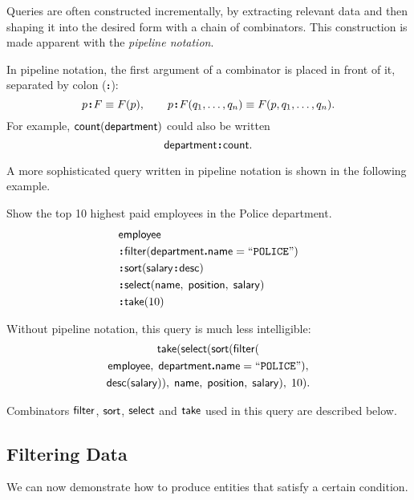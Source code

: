 Queries are often constructed incrementally, by extracting relevant data and
then shaping it into the desired form with a chain of combinators.  This
construction is made apparent with the \emph{pipeline notation}.

In pipeline notation, the first argument of a combinator is placed in front of
it, separated by colon ($\,\!\boldsymbol{:}\!\,$):
\begin{equation*}
    p \!\boldsymbol{:}\! F \equiv F(p), \qquad
    p \!\boldsymbol{:}\! F(q_1,\ldots,q_n) \equiv F(p,q_1,\ldots,q_n).
\end{equation*}
For example, $\mathsf{count}(\mathsf{department})$ could also be written
\begin{equation*}
    \mathsf{department}\!\boldsymbol{:}\!\mathsf{count}.
\end{equation*}

A more sophisticated query written in pipeline notation is shown in the
following example.

\begin{demo}
    \label{ex:top-ten-highest-paid-policemen}
    Show the top 10 highest paid employees in the Police department.
    \begin{align*}
        & \Employee \\
        & \Apply\Filter(\Department\To\Name = \textliteral{POLICE}) \\
        & \Apply\Sort(\Salary\Apply\Desc) \\
        & \Apply\Select(\Name,\; \Position,\; \Salary) \\
        & \Apply\Take(10)
    \end{align*}
\end{demo}

Without pipeline notation, this query is much less intelligible:
\begin{multline*}
    \mathsf{take}(\mathsf{select}(\mathsf{sort}(\mathsf{filter}( \\
    \mathsf{employee},\; \mathsf{department}\boldsymbol{.}\mathsf{name} = \mathtt{``POLICE"}), \\
    \mathsf{desc}(\mathsf{salary})),\; \mathsf{name},\; \mathsf{position},\; \mathsf{salary}),\; 10).
\end{multline*}

Combinators $\mathsf{filter}$, $\mathsf{sort}$, $\mathsf{select}$ and $\mathsf{take}$ used in this query are
described below.

\subsection*{Filtering Data}

We can now demonstrate how to produce entities that satisfy a certain
condition.

